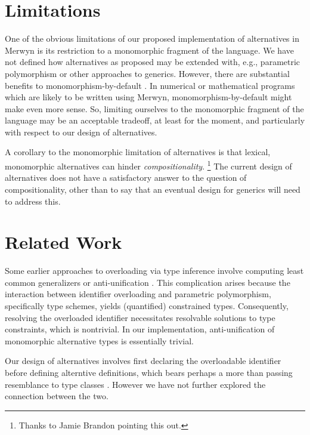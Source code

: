 \documentclass{article}
\renewcommand{\=}{\triangleq}
\begin{document}
\section{Limitations}

One of the obvious limitations of
our proposed implementation of alternatives in Merwyn is its restriction to
a monomorphic fragment of the language.
We have not defined how alternatives as proposed may be extended with,
e.g., parametric polymorphism or other approaches to generics.
However, there are substantial benefits to monomorphism-by-default
\cite{vytiniotis10}.
In numerical or mathematical programs which are likely to be written using
Merwyn,
monomorphism-by-default might make even more sense.
So, limiting ourselves to the monomorphic fragment of the language may be
an acceptable tradeoff, at least for the moment,
and particularly with respect to our design of alternatives.

A corollary to the monomorphic limitation of alternatives is that
lexical, monomorphic alternatives can hinder \emph{compositionality}.%
\footnote{Thanks to Jamie Brandon pointing this out.}
The current design of alternatives does not have a satisfactory answer to
the question of compositionality, other than to say that an eventual design
for generics will need to address this.

\section{Related Work}

Some earlier approaches to overloading via type inference involve computing
least common generalizers or anti-unification
\cite{smith94,camarao99}.
This complication arises because the interaction between identifier overloading
and parametric polymorphism, specifically type schemes,
yields (quantified) constrained types.
Consequently, resolving the overloaded identifier necessitates resolvable
solutions to type constraints, which is nontrivial.
In our implementation,
anti-unification of monomorphic alternative types is essentially trivial.

Our design of alternatives involves first declaring the overloadable
identifier before defining alterntive definitions,
which bears perhaps a more than passing resemblance to type classes
\cite{wadler89}.
However we have not further explored the connection between the two.



\end{document}
